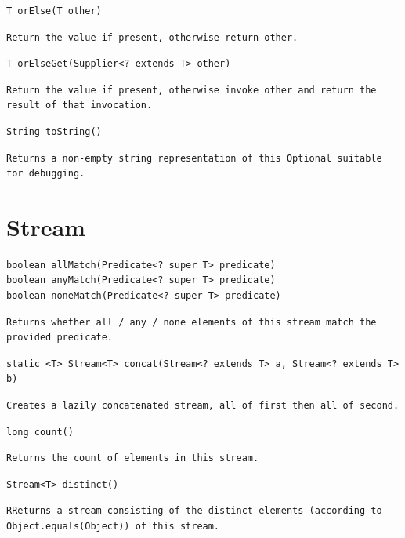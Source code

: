 \documentclass[5pt, portrait]{article}
\begin{document}
\begin{verbatim}
T orElse(T other)
\end{verbatim}
\begin{verbatim}
Return the value if present, otherwise return other.
\end{verbatim}  

\begin{verbatim}
T orElseGet(Supplier<? extends T> other)
\end{verbatim}
\begin{verbatim}
Return the value if present, otherwise invoke other and return the result of that invocation.
\end{verbatim}  

\begin{verbatim}
String toString()
\end{verbatim}
\begin{verbatim}
Returns a non-empty string representation of this Optional suitable for debugging.
\end{verbatim}  

\section{Stream}
\begin{verbatim}
boolean allMatch(Predicate<? super T> predicate)
boolean anyMatch(Predicate<? super T> predicate)
boolean noneMatch(Predicate<? super T> predicate)
\end{verbatim}
\begin{verbatim}
Returns whether all / any / none elements of this stream match the provided predicate.
\end{verbatim} 

\begin{verbatim}
static <T> Stream<T> concat(Stream<? extends T> a, Stream<? extends T> b)
\end{verbatim}
\begin{verbatim}
Creates a lazily concatenated stream, all of first then all of second.
\end{verbatim} 

\begin{verbatim}
long count()
\end{verbatim}
\begin{verbatim}
Returns the count of elements in this stream.
\end{verbatim} 

\begin{verbatim}
Stream<T> distinct()
\end{verbatim}
\begin{verbatim}
RReturns a stream consisting of the distinct elements (according to Object.equals(Object)) of this stream.
\end{verbatim} 
\end{document}
